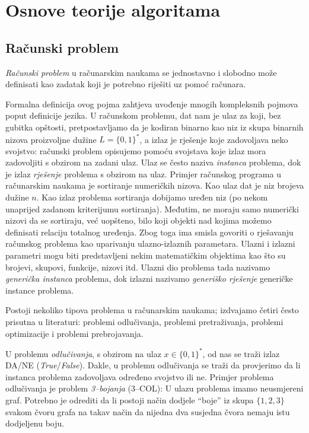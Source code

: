 \chapter{Osnove teorije algoritama}

\section{Računski problem}

\textit{Računski problem} u računarskim naukama se jednostavno i slobodno može definisati kao zadatak koji je potrebno riješiti uz pomoć računara. 

Formalna definicija ovog pojma zahtjeva uvođenje mnogih kompleksnih pojmova poput definicije jezika.  U računskom problemu, dat nam je ulaz za koji, bez gubitka opštosti, pretpostavljamo da je kodiran  binarno kao niz iz skupa binarnih nizova proizvoljne dužine $L=\{0, 1\}^*$, a  izlaz je 
rješenje koje zadovoljava neko svojstvo: računski problem  opisujemo  pomoću svojstava koje izlaz mora zadovoljiti s obzirom na zadani ulaz. Ulaz se često naziva \textit{instanca} problema, dok je izlaz \textit{rješenje} problema s obzirom na ulaz. Primjer računskog programa u računarskim naukama je sortiranje numeričkih nizova. Kao ulaz dat je niz brojeva dužine $n$. Kao izlaz problema sortiranja dobijamo uređen niz (po nekom unaprijed zadanom kriterijumu sortiranja). Međutim, ne moraju samo numerički nizovi da se sortiraju, već uopšteno, bilo koji objekti nad kojima možemo definisati relaciju totalnog uređenja. Zbog toga ima smisla govoriti o rješavanju računskog problema kao 
 uparivanju ulazno-izlaznih parametara. Ulazni i izlazni parametri mogu biti predstavljeni nekim matematičkim objektima kao što su brojevi, skupovi, funkcije, nizovi itd. Ulazni dio problema tada nazivamo \textit{generička instanca} problema, dok izlazni nazivamo  \textit{generiško rješenje} generičke instance problema. 
 
 Postoji nekoliko tipova problema u računarskim naukama; izdvajamo četiri često prisutna u literaturi: problemi odlučivanja, problemi pretraživanja, problemi optimizacije i problemi prebrojavanja. 
 
 U problemu \textit{odlučivanja}, s obzirom na ulaz $x \in \{0, 1\}^*$, od nas se traži izlaz DA/NE (\emph{True}/\emph{False}). Dakle, u problemu odlučivanja se traži da provjerimo da li instanca problema zadovoljava određeno svojstvo ili ne. Primjer problema odlučivanja je problem \textit{3--bojanja} (3--COL):
 U ulazu problema imamo neusmjereni graf. Potrebno je odrediti da li postoji način dodjele   ``boje''  iz skupa $\{1, 2, 3\}$ svakom čvoru grafa na takav način da nijedna dva susjedna čvora nemaju istu dodjeljenu boju.
 
